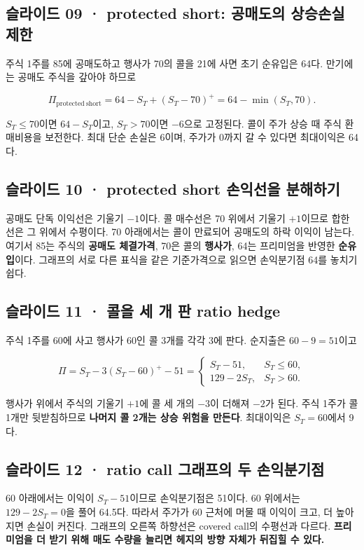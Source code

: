 \documentclass[11pt,a4paper]{article}
\begin{document}
\subsection{슬라이드 09 · protected short: 공매도의 상승손실 제한}
주식 1주를 85에 공매도하고 행사가 70의 콜을 21에 사면 초기 순유입은 64다. 만기에는 공매도 주식을 갚아야 하므로\par

\[
\Pi_{\mathrm{protected\ short}}=64-S_T+(S_T-70)^+
=64-\min(S_T,70).
\]

$S_T\leq70$이면 $64-S_T$이고, $S_T>70$이면 $-6$으로 고정된다. 콜이 주가 상승 때 주식 환매비용을 보전한다. 최대 단순 손실은 6이며, 주가가 0까지 갈 수 있다면 최대이익은 64다.\par

\subsection{슬라이드 10 · protected short 손익선을 분해하기}
공매도 단독 이익선은 기울기 $-1$이다. 콜 매수선은 70 위에서 기울기 $+1$이므로 합한 선은 그 위에서 수평이다. 70 아래에서는 콜이 만료되어 공매도의 하락 이익이 남는다. 여기서 85는 주식의 \textbf{공매도 체결가격}, 70은 콜의 \textbf{행사가}, 64는 프리미엄을 반영한 \textbf{순유입}이다. 그래프의 서로 다른 표식을 같은 기준가격으로 읽으면 손익분기점 64를 놓치기 쉽다.\par

\subsection{슬라이드 11 · 콜을 세 개 판 ratio hedge}
주식 1주를 60에 사고 행사가 60인 콜 3개를 각각 3에 판다. 순지출은 $60-9=51$이고\par

\[
\Pi=S_T-3(S_T-60)^+-51
=\begin{cases}S_T-51,&S_T\leq60,\\129-2S_T,&S_T>60.\end{cases}
\]

행사가 위에서 주식의 기울기 $+1$에 콜 세 개의 $-3$이 더해져 $-2$가 된다. 주식 1주가 콜 1개만 뒷받침하므로 \textbf{나머지 콜 2개는 상승 위험을 만든다}. 최대이익은 $S_T=60$에서 9다.\par

\subsection{슬라이드 12 · ratio call 그래프의 두 손익분기점}
60 아래에서는 이익이 $S_T-51$이므로 손익분기점은 51이다. 60 위에서는 $129-2S_T=0$을 풀어 64.5다. 따라서 주가가 60 근처에 머물 때 이익이 크고, 더 높아지면 손실이 커진다. 그래프의 오른쪽 하향선은 covered call의 수평선과 다르다. \textbf{프리미엄을 더 받기 위해 매도 수량을 늘리면 헤지의 방향 자체가 뒤집힐 수 있다.}\par
\end{document}
